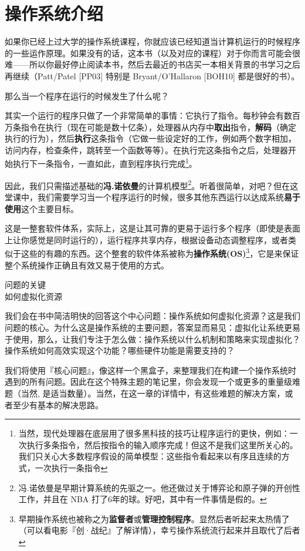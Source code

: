 \chapter{操作系统介绍}
\thispagestyle{empty}

如果你已经上过大学的操作系统课程，你就应该已经知道当计算机运行的时候程序的一些运作原理。如果没有的话，这本书（以及对应的课程）对于你而言可能会很难——所以你最好停止阅读本书，然后去最近的书店买一本相关背景的书学习之后再继续（Patt/Patel [PP03] 特别是 Bryant/O’Hallaron [BOH10] 都是很好的书）。

那么当一个程序在运行的时候发生了什么呢？

其实一个运行的程序只做了一个非常简单的事情：它执行了指令。每秒钟会有数百万条指令在执行（现在可能是数十亿条），处理器从内存中\textbf{取出}指令，\textbf{解码}（确定执行的行为），然后\textbf{执行}这条指令（它做一些设定好的工作，例如两个数字相加，访问内存，检查条件，跳转至一个函数等等）。在执行完这条指令之后，处理器开始执行下一条指令，一直如此，直到程序执行完成\footnote{当然，现代处理器在底层用了很多黑科技的技巧让程序运行的更快，例如：一次执行多条指令，然后按指令的输入顺序完成！但这不是我们这里所关心的。我们只关心大多数程序假设的简单模型：这些指令看起来以有序且连续的方式，一次执行一条指令}。

因此，我们只需描述基础的\textbf{冯.诺依曼}的计算机模型\footnote{冯.诺依曼是早期计算系统的先驱之一。他还做过关于博弈论和原子弹的开创性工作，并且在 NBA 打了6年的球。好吧，其中有一件事情是假的。}。听着很简单，对吧？但在这堂课中，我们需要学习当一个程序运行的时候，很多其他东西运行以达成系统\textbf{易于使用}这个主要目标。

这是一整套软件体系，实际上，这是让其可靠的更易于运行多个程序（即使是表面上让你感觉是同时运行的），运行程序共享内存，根据设备动态调整程序，或者类似于这些的有趣的东西。这个整套的软件体系被称为\textbf{操作系统(OS)}\footnote{早期操作系统也被称之为\textbf{监督者}或\textbf{管理控制程序}。显然后者听起来太热情了（可以看电影『创·战纪』了解详情），幸亏操作系统流行起来并且取代了后者}，它是来保证整个系统操作正确且有效又易于使用的方式。

\begin{tcolorbox}[colframe=grey,colback= grey,arc=0pt,left=6pt,right=6pt,top=6pt,bottom=6pt,boxsep=0pt]
\begin{center}
  问题的关键\\
  如何虚拟化资源
\end{center}
我们会在书中简洁明快的回答这个中心问题：操作系统如何虚拟化资源？这是我们问题的核心。为什么这是操作系统的主要问题，答案显而易见：虚拟化让系统更易于使用，那么，让我们专注于怎么做：操作系统以什么机制和策略来实现虚拟化？操作系统如何高效实现这个功能？哪些硬件功能是需要支持的？

我们将使用『核心问题』，像这样一个黑盒子，来整理我们在构建一个操作系统时遇到的所有问题。因此在这个特殊主题的笔记里，你会发现一个或更多的重量级难题（当然, 是适当数量）。当然，在这一章的详情中，有这些难题的解决方案，或者至少有基本的解决思路。
\end{tcolorbox}

